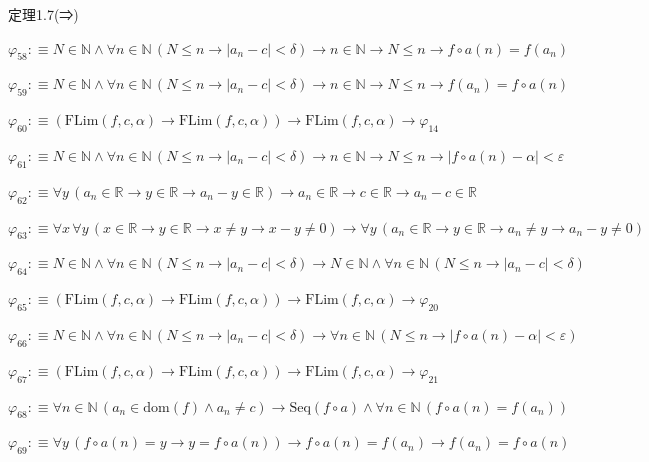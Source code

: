 \begin{fullproof}{定理1.7(⇒)}
\begin{abbrevlist}
\item $\varphi_{58} :\equiv N \in \mathbb{N} \land \forall n \in \mathbb{N}\,(N \leq n \to \lvert a_{n} - c \rvert < \delta) \to n \in \mathbb{N} \to N \leq n \to f \circ a(n) = f(a_{n})$
\item $\varphi_{59} :\equiv N \in \mathbb{N} \land \forall n \in \mathbb{N}\,(N \leq n \to \lvert a_{n} - c \rvert < \delta) \to n \in \mathbb{N} \to N \leq n \to f(a_{n}) = f \circ a(n)$
\item $\varphi_{60} :\equiv (\mathrm{FLim}(f,c,\alpha) \to \mathrm{FLim}(f,c,\alpha)) \to \mathrm{FLim}(f,c,\alpha) \to \varphi_{14}$
\item $\varphi_{61} :\equiv N \in \mathbb{N} \land \forall n \in \mathbb{N}\,(N \leq n \to \lvert a_{n} - c \rvert < \delta) \to n \in \mathbb{N} \to N \leq n \to \lvert f \circ a(n) - \alpha \rvert < \varepsilon$
\item $\varphi_{62} :\equiv \forall y\,(a_{n} \in \mathbb{R} \to y \in \mathbb{R} \to a_{n} - y \in \mathbb{R}) \to a_{n} \in \mathbb{R} \to c \in \mathbb{R} \to a_{n} - c \in \mathbb{R}$
\item $\varphi_{63} :\equiv \forall x\,\forall y\,(x \in \mathbb{R} \to y \in \mathbb{R} \to x \neq y \to x - y \neq 0) \to \forall y\,(a_{n} \in \mathbb{R} \to y \in \mathbb{R} \to a_{n} \neq y \to a_{n} - y \neq 0)$
\item $\varphi_{64} :\equiv N \in \mathbb{N} \land \forall n \in \mathbb{N}\,(N \leq n \to \lvert a_{n} - c \rvert < \delta) \to N \in \mathbb{N} \land \forall n \in \mathbb{N}\,(N \leq n \to \lvert a_{n} - c \rvert < \delta)$
\item $\varphi_{65} :\equiv (\mathrm{FLim}(f,c,\alpha) \to \mathrm{FLim}(f,c,\alpha)) \to \mathrm{FLim}(f,c,\alpha) \to \varphi_{20}$
\item $\varphi_{66} :\equiv N \in \mathbb{N} \land \forall n \in \mathbb{N}\,(N \leq n \to \lvert a_{n} - c \rvert < \delta) \to \forall n \in \mathbb{N}\,(N \leq n \to \lvert f \circ a(n) - \alpha \rvert < \varepsilon)$
\item $\varphi_{67} :\equiv (\mathrm{FLim}(f,c,\alpha) \to \mathrm{FLim}(f,c,\alpha)) \to \mathrm{FLim}(f,c,\alpha) \to \varphi_{21}$
\item $\varphi_{68} :\equiv \forall n \in \mathbb{N}\,(a_{n} \in \mathrm{dom}(f) \land a_{n} \neq c) \to \mathrm{Seq}(f \circ a) \land \forall n \in \mathbb{N}\,(f \circ a(n) = f(a_{n}))$
\item $\varphi_{69} :\equiv \forall y\,(f \circ a(n) = y \to y = f \circ a(n)) \to f \circ a(n) = f(a_{n}) \to f(a_{n}) = f \circ a(n)$

\end{abbrevlist}
\end{fullproof}
